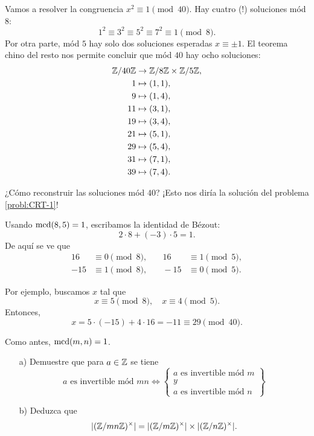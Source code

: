 \documentclass{article}
\begin{document}
\begin{ejemplo}
  Vamos a resolver la congruencia $x^2 \equiv 1 \pmod{40}$.
  Hay cuatro (!)  soluciones mód $8$:
  $$1^2 \equiv 3^2 \equiv 5^2 \equiv 7^2 \equiv 1 \pmod{8}.$$
  Por otra parte, mód $5$ hay solo dos soluciones esperadas $x \equiv \pm 1$.
  El teorema chino del resto nos permite concluir que mód $40$ hay ocho
  soluciones:
    \begin{align*}
      \mathbb{Z}/40\mathbb{Z} & \to \mathbb{Z}/8\mathbb{Z} \times \mathbb{Z}/5\mathbb{Z}, \\
      1 & \mapsto (1, 1), \\
      9 & \mapsto (1, 4), \\
      11 & \mapsto (3, 1), \\
      19 & \mapsto (3, 4), \\
      21 & \mapsto (5, 1), \\
      29 & \mapsto (5, 4), \\
      31 & \mapsto (7, 1), \\
      39 & \mapsto (7, 4).
    \end{align*}

  ¿Cómo reconstruir las soluciones mód $40$?
  ¡Esto nos diría la solución del problema \ref{probl:CRT-1}!

  Usando $\operatorname{mcd}(8,5) = 1$, escribamos la identidad de Bézout:
  $$2\cdot 8 + (-3)\cdot 5 = 1.$$
  De aquí se ve que
  \begin{align*}
    16 & \equiv 0 \pmod{8}, & \quad 16 & \equiv 1 \pmod{5}, \\
    -15 & \equiv 1 \pmod{8}, & \quad -15 & \equiv 0 \pmod{5}.
  \end{align*}

  Por ejemplo, buscamos $x$ tal que
  $$x \equiv 5 \pmod{8}, \quad x \equiv 4 \pmod{5}.$$
  Entonces,
  $$x = 5\cdot (-15) + 4\cdot 16 = -11 \equiv 29 \pmod{40}.$$
\end{ejemplo}

\begin{problema}
  \label{probl:crt-invertibles}
  Como antes, $\operatorname{mcd} (m,n) = 1$.

  \begin{itemize}
  \item[a)] Demuestre que para $a \in \mathbb{Z}$ se tiene
    \[
      a \text{ es invertible mód }mn
      \iff
      \left\{\begin{array}{c}
               a \text{ es invertible mód }m \\
               y \\
               a \text{ es invertible mód }n
             \end{array}\right\}
    \]

  \item[b)] Deduzca que
    $$|(\mathbb{Z}/mn\mathbb{Z})^\times| = |(\mathbb{Z}/m\mathbb{Z})^\times| \times |(\mathbb{Z}/n\mathbb{Z})^\times|.$$
  \end{itemize}
\end{problema}
\end{document}
